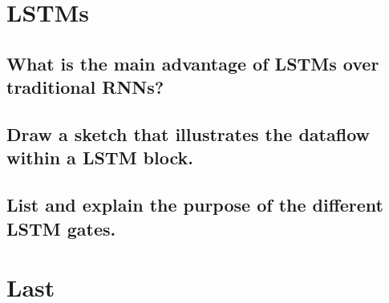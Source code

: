 \section{LSTMs}
\subsection{What is the main advantage of LSTMs over traditional RNNs?}
\subsection{Draw a sketch that illustrates the dataflow within a LSTM block.}
\subsection{List and explain the purpose of the different LSTM gates.}

\section{Last}\label{sec:ref}
